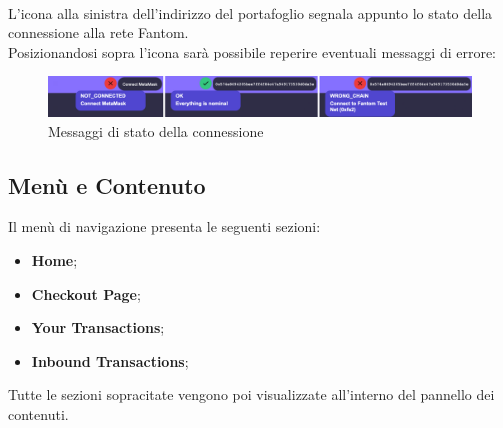     \textbf{}\\
    L'icona alla sinistra dell'indirizzo del portafoglio segnala appunto lo stato della connessione alla rete Fantom\glo{}.\\
    Posizionandosi sopra l'icona sarà possibile reperire eventuali messaggi di errore:
    \begin{figure}[H]
        \centering
        \includegraphics[scale=0.3]{immagini/stateSignal.png}
        \caption{Messaggi di stato della connessione}
    \end{figure}

    \subsection{Menù e Contenuto}
    Il menù di navigazione presenta le seguenti sezioni:
    \begin{itemize}
        \item \textbf{Home};
        \item \textbf{Checkout Page};
        \item \textbf{Your Transactions};
        \item \textbf{Inbound Transactions};
    \end{itemize}

    Tutte le sezioni sopracitate vengono poi visualizzate all'interno del pannello dei contenuti.

    
